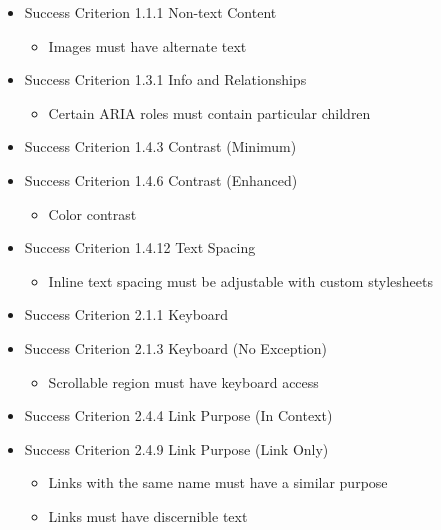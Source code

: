 \documentclass{master_thesis}
\begin{document}
\begin{itemize}
	\item Success Criterion 1.1.1 Non-text Content
	\begin{itemize}
		\item Images must have alternate text
	\end{itemize}

	\item Success Criterion 1.3.1 Info and Relationships
	\begin{itemize}
		\item Certain ARIA roles must contain particular children
	\end{itemize}

	\item Success Criterion 1.4.3 Contrast (Minimum)
	\item Success Criterion 1.4.6 Contrast (Enhanced)
	\begin{itemize}
		\item Color contrast
	\end{itemize}

	\item Success Criterion 1.4.12 Text Spacing
	\begin{itemize}
		\item Inline text spacing must be adjustable with custom stylesheets
	\end{itemize}

	\item Success Criterion 2.1.1 Keyboard
	\item Success Criterion 2.1.3 Keyboard (No Exception)
	\begin{itemize}
		\item Scrollable region must have keyboard access
	\end{itemize}

	\item Success Criterion 2.4.4 Link Purpose (In Context)
	\item Success Criterion 2.4.9 Link Purpose (Link Only)
	\begin{itemize}
		\item Links with the same name must have a similar purpose
		\item Links must have discernible text
	\end{itemize}


\end{itemize}
\end{document}
